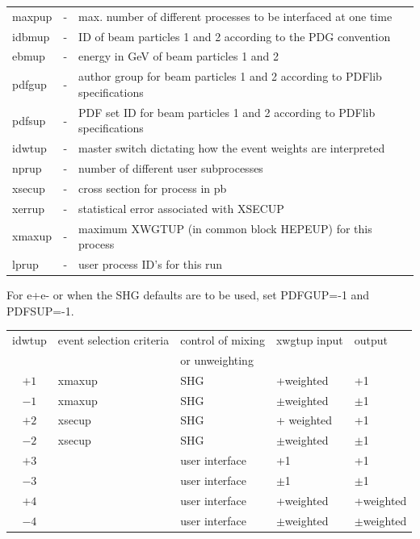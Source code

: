 \begin{center}
\begin{tabular}{lcl}
  maxpup & - & max. number of different processes to be interfaced at one time\\
  idbmup & - & ID of beam particles 1 and 2 according to the PDG convention\\
  ebmup  & - & energy in GeV of beam particles 1 and 2\\
  pdfgup & - & author group for beam particles 1 and 2 according to
               PDFlib specifications\\
  pdfsup & - & PDF set ID for beam particles 1 and 2 according to
               PDFlib specifications\\
  idwtup & - & master switch dictating how the event weights are interpreted\\
  nprup  & - & number of different user subprocesses\\
  xsecup & - & cross section for process in pb\\
  xerrup & - & statistical error associated with XSECUP\\
  xmaxup & - & maximum XWGTUP (in common block HEPEUP) for this process\\
  lprup  & - & user process ID's for this run\\
\end{tabular}
\end{center}

For e+e- or when the SHG defaults are to be used, set PDFGUP=-1 and PDFSUP=-1.

\begin{center}
\begin{tabular}{cllll}
idwtup & event selection criteria & control of mixing &
    xwgtup input & output \\
 &  &  or unweighting & & \\
  $+1$	& xmaxup	&	SHG		& +weighted	& +1 \\
  $-1$	& xmaxup	&	SHG		& $\pm$weighted	& $\pm$1 \\
  $+2$	& xsecup	&	SHG		& + weighted	& +1 \\
  $-2$	& xsecup	&	SHG		& $\pm$weighted	& $\pm$1 \\
  $+3$	& 		& user interface	& +1		& +1 \\
  $-3$	& 		& user interface	& $\pm$1	& $\pm$1 \\
  $+4$	& 		& user interface	& +weighted	& +weighted \\
  $-4$	& 		& user interface	& $\pm$weighted	& $\pm$weighted \\
\end{tabular}
\end{center}


